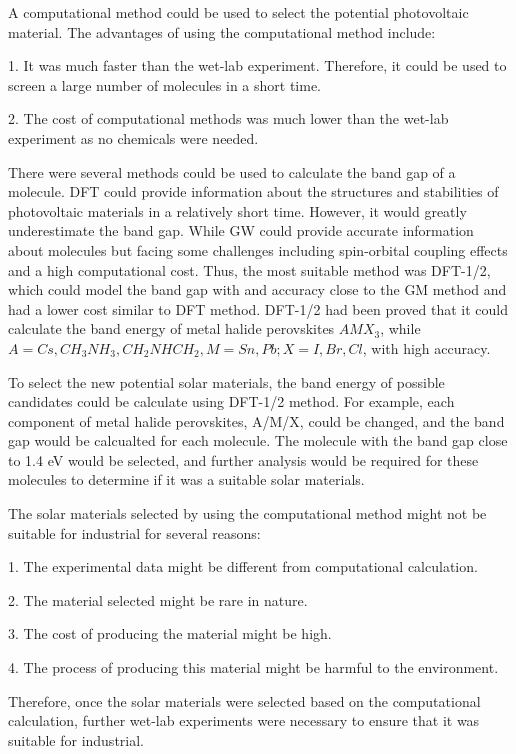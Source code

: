 \documentclass[twocolumn]{article} %
\begin{document}
A computational method could be used to select the potential photovoltaic material. The advantages of using the computational method include:

1. It was much faster than the wet-lab experiment. Therefore, it could be used to screen a large number of molecules in a short time.

2. The cost of computational methods was much lower than the wet-lab experiment as no chemicals were needed. 

There were several methods could be used to calculate the band gap of a molecule. DFT could provide information about the structures and stabilities of photovoltaic materials in a relatively short time. However, it would greatly underestimate the band gap. While GW could provide accurate information about molecules but facing some challenges including spin-orbital coupling effects and a high computational cost. Thus, the most suitable method was DFT-1/2, which could model the band gap with and accuracy close to the GM method and had a lower cost similar to DFT method. DFT-1/2 had been proved that it could calculate the band energy of metal halide perovskites $AMX_3$, while $A=Cs, CH_3NH_3, CH_2NHCH_2, M=Sn, Pb; X=I, Br, Cl$, with high accuracy. 

To select the new potential solar materials, the band energy of possible candidates could be calculate using DFT-1/2 method. For example, each component of metal halide perovskites, A/M/X, could be changed, and the band gap would be calcualted for each molecule. The molecule with the band gap close to 1.4 eV would be selected, and further analysis would be required for these molecules to determine if it was a suitable solar materials. 

The solar materials selected by using the computational method might not be suitable for industrial for several reasons:

1. The experimental data might be different from computational calculation.

2. The material selected might be rare in nature.

3. The cost of producing the material might be high.

4. The process of producing this material might be harmful to the environment. 

Therefore, once the solar materials were selected based on the computational calculation, further wet-lab experiments were necessary to ensure that it was suitable for industrial. 
\end{document}
